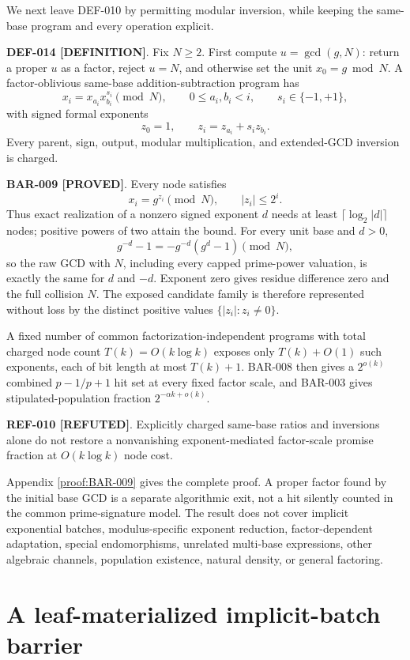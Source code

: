 \documentclass[11pt]{article}
\newcommand{\claimstatus}[2]{\textbf{#1 [#2]}}
\begin{document}
We next leave DEF-010 by permitting modular inversion, while keeping the
same-base program and every operation explicit.

\claimstatus{DEF-014}{DEFINITION}. Fix \(N\ge2\). First compute
\(u=\gcd(g,N)\): return a proper \(u\) as a factor, reject \(u=N\), and
otherwise set the unit \(x_0=g\bmod N\). A factor-oblivious same-base
addition-subtraction program has
\[
x_i=x_{a_i}x_{b_i}^{s_i}\pmod N,\qquad
0\le a_i,b_i<i,\qquad s_i\in\{-1,+1\},
\]
with signed formal exponents
\[
z_0=1,\qquad z_i=z_{a_i}+s_i z_{b_i}.
\]
Every parent, sign, output, modular multiplication, and extended-GCD
inversion is charged.

\claimstatus{BAR-009}{PROVED}. Every node satisfies
\[
x_i=g^{z_i}\pmod N,\qquad |z_i|\le2^i.
\]
Thus exact realization of a nonzero signed exponent \(d\) needs at least
\(\lceil\log_2|d|\rceil\) nodes; positive powers of two attain the bound.
For every unit base and \(d>0\),
\[
g^{-d}-1=-g^{-d}(g^d-1)\pmod N,
\]
so the raw GCD with \(N\), including every capped prime-power valuation, is
exactly the same for \(d\) and \(-d\). Exponent zero gives residue difference
zero and the full collision \(N\). The exposed candidate family is therefore
represented without loss by the distinct positive values
\(\{|z_i|:z_i\ne0\}\).

A fixed number of common factorization-independent programs with total
charged node count \(T(k)=O(k\log k)\) exposes only \(T(k)+O(1)\) such
exponents, each of bit length at most \(T(k)+1\). BAR-008 then gives a
\(2^{o(k)}\) combined \(p-1/p+1\) hit set at every fixed factor scale, and
BAR-003 gives stipulated-population fraction
\(2^{-\alpha k+o(k)}\).

\claimstatus{REF-010}{REFUTED}. Explicitly charged same-base ratios and
inversions alone do not restore a nonvanishing exponent-mediated
factor-scale promise fraction at \(O(k\log k)\) node cost.

Appendix \ref{proof:BAR-009} gives the complete proof. A proper factor found
by the initial base GCD is a separate algorithmic exit, not a hit silently
counted in the common prime-signature model. The result does not cover
implicit exponential batches, modulus-specific exponent reduction,
factor-dependent adaptation, special endomorphisms, unrelated multi-base
expressions, other algebraic channels, population existence, natural
density, or general factoring.

\section{A leaf-materialized implicit-batch barrier}
\end{document}
